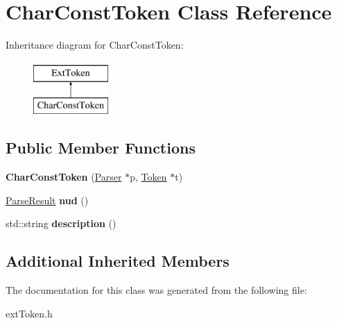 \hypertarget{classCharConstToken}{\section{Char\-Const\-Token Class Reference}
\label{classCharConstToken}
}
Inheritance diagram for Char\-Const\-Token\-:\begin{figure}[H]
\begin{center}
\leavevmode
\includegraphics[height=2.000000cm]{classCharConstToken}
\end{center}
\end{figure}
\subsection*{Public Member Functions}
\begin{DoxyCompactItemize}
\item 
\hypertarget{classCharConstToken_a9dcb8d0d26c4f9c66570357641933c51}{{\bfseries Char\-Const\-Token} (\hyperlink{classParser}{Parser} $\ast$p, \hyperlink{classToken}{Token} $\ast$t)}\label{classCharConstToken_a9dcb8d0d26c4f9c66570357641933c51}

\item 
\hypertarget{classCharConstToken_a33032d6b35ef2b6ebc4db770b374ad5b}{\hyperlink{classParseResult}{Parse\-Result} {\bfseries nud} ()}\label{classCharConstToken_a33032d6b35ef2b6ebc4db770b374ad5b}

\item 
\hypertarget{classCharConstToken_addf2603d51bc2be908137f06737d8b30}{std\-::string {\bfseries description} ()}\label{classCharConstToken_addf2603d51bc2be908137f06737d8b30}

\end{DoxyCompactItemize}
\subsection*{Additional Inherited Members}


The documentation for this class was generated from the following file\-:\begin{DoxyCompactItemize}
\item 
ext\-Token.\-h\end{DoxyCompactItemize}
